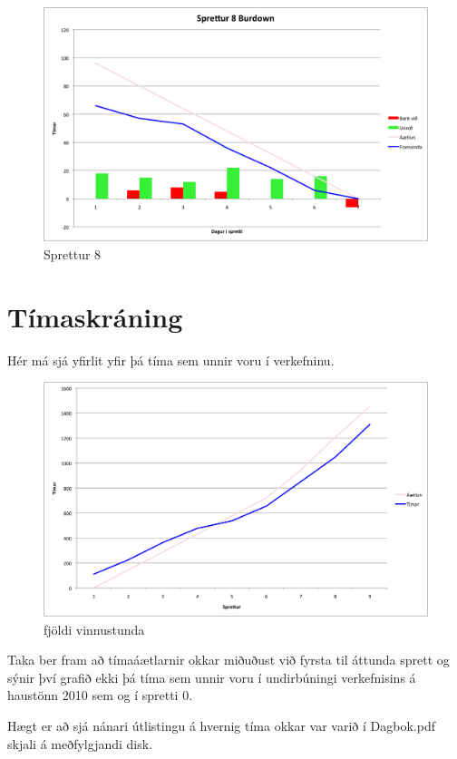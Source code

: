 \documentclass{article}
\begin{document}
\begin{figure}[H]
  \centering
  \includegraphics[width=1\textwidth]{Sprettur8_Burndown.png} 
  \caption{Sprettur 8} 
\end{figure}

\newpage
\section{Tímaskráning}
Hér má sjá yfirlit yfir þá tíma sem unnir voru í verkefninu. 

\begin{figure}[H]
  \centering
  \includegraphics[width=1\textwidth]{fjoldi_vinnustunda.png} 
  \caption{fjöldi vinnustunda} 
\end{figure}

Taka ber fram að tímaáætlarnir okkar miðuðust við fyrsta til áttunda sprett og sýnir því grafið ekki þá tíma sem unnir voru í undirbúningi verkefnisins á haustönn 2010 sem og í spretti 0.

Hægt er að sjá nánari útlistingu á hvernig tíma okkar var varið í Dagbok.pdf skjali á meðfylgjandi disk.
\end{document}
